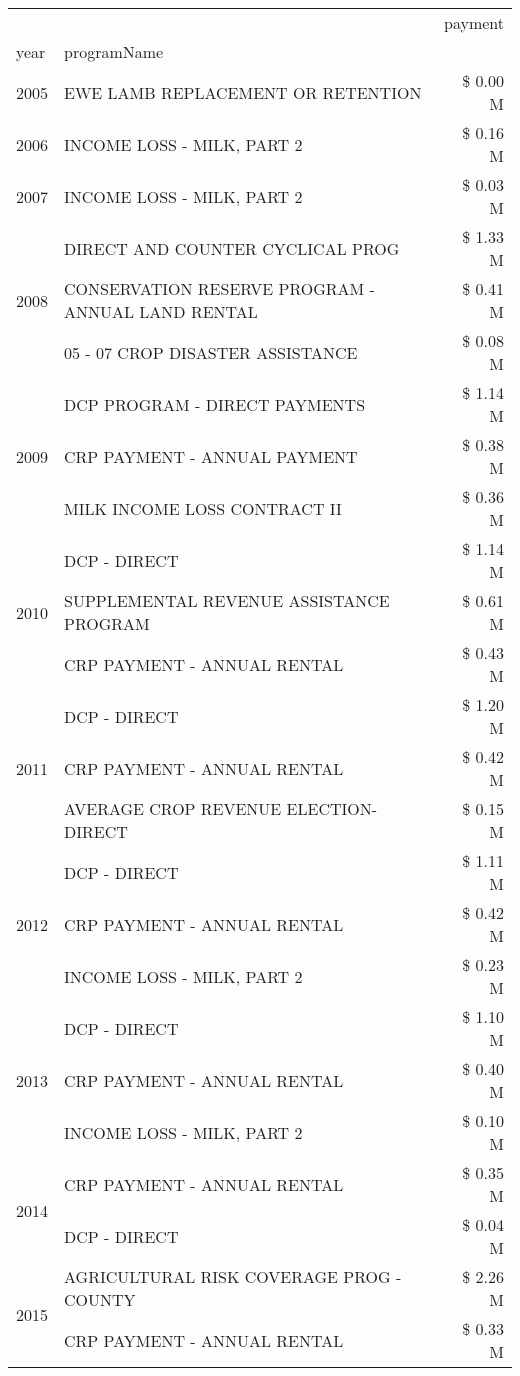\begin{tabular}{llr}
\toprule
 &  & payment \\
year & programName &  \\
\midrule
2005 & EWE LAMB REPLACEMENT OR RETENTION & \$ 0.00 M \\
\cline{1-3}
2006 & INCOME LOSS - MILK, PART 2 & \$ 0.16 M \\
\cline{1-3}
2007 & INCOME LOSS - MILK, PART 2 & \$ 0.03 M \\
\cline{1-3}
\multirow[t]{3}{*}{2008} & DIRECT AND COUNTER CYCLICAL PROG & \$ 1.33 M \\
 & CONSERVATION RESERVE PROGRAM - ANNUAL LAND RENTAL & \$ 0.41 M \\
 & 05 - 07 CROP DISASTER ASSISTANCE & \$ 0.08 M \\
\cline{1-3}
\multirow[t]{3}{*}{2009} & DCP PROGRAM - DIRECT PAYMENTS & \$ 1.14 M \\
 & CRP PAYMENT - ANNUAL PAYMENT & \$ 0.38 M \\
 & MILK INCOME LOSS CONTRACT II & \$ 0.36 M \\
\cline{1-3}
\multirow[t]{3}{*}{2010} & DCP - DIRECT & \$ 1.14 M \\
 & SUPPLEMENTAL REVENUE ASSISTANCE PROGRAM & \$ 0.61 M \\
 & CRP PAYMENT - ANNUAL RENTAL & \$ 0.43 M \\
\cline{1-3}
\multirow[t]{3}{*}{2011} & DCP - DIRECT & \$ 1.20 M \\
 & CRP PAYMENT - ANNUAL RENTAL & \$ 0.42 M \\
 & AVERAGE CROP REVENUE ELECTION-DIRECT & \$ 0.15 M \\
\cline{1-3}
\multirow[t]{3}{*}{2012} & DCP - DIRECT & \$ 1.11 M \\
 & CRP PAYMENT - ANNUAL RENTAL & \$ 0.42 M \\
 & INCOME LOSS - MILK, PART 2 & \$ 0.23 M \\
\cline{1-3}
\multirow[t]{3}{*}{2013} & DCP - DIRECT & \$ 1.10 M \\
 & CRP PAYMENT - ANNUAL RENTAL & \$ 0.40 M \\
 & INCOME LOSS - MILK, PART 2 & \$ 0.10 M \\
\cline{1-3}
\multirow[t]{2}{*}{2014} & CRP PAYMENT - ANNUAL RENTAL & \$ 0.35 M \\
 & DCP - DIRECT & \$ 0.04 M \\
\cline{1-3}
\multirow[t]{3}{*}{2015} & AGRICULTURAL RISK COVERAGE PROG - COUNTY & \$ 2.26 M \\
 & CRP PAYMENT - ANNUAL RENTAL & \$ 0.33 M \\

\end{tabular}

